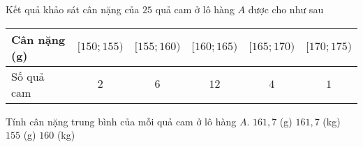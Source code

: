 \begin{ex}%
	Kết quả khảo sát cân nặng của $25$ quả cam ở lô hàng $A$ được cho như sau
	\begin{center}
		\begin{tabular}{|l|c|c|c|c|c|}
			\hline
			Cân nặng (g) & $[150;155)$ & $[155;160)$ & $[160;165)$ & $[165;170)$ & $[170;175)$ \\
			\hline
			Số quả cam   & $2$         & $6$         & $12$        & $4$         & $1$         \\
			\hline
		\end{tabular}
	\end{center}
	Tính cân nặng trung bình của mỗi quả cam ở lô hàng $A$.
	\choice
	{\True $161{,}7$ (g)}
	{$161{,}7$ (kg)}
	{$155$ (g)}
	{$160$ (kg)}
\end{ex}
